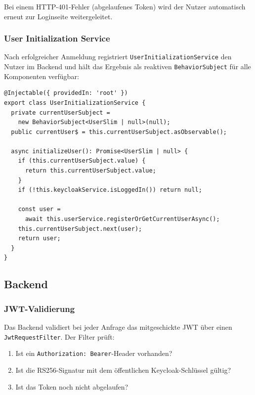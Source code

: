 Bei einem HTTP-401-Fehler (abgelaufenes Token) wird der Nutzer
automatisch erneut zur Loginseite weitergeleitet.

\subsubsection{User Initialization Service}

Nach erfolgreicher Anmeldung registriert \texttt{UserInitializationService}
den Nutzer im Backend und hält das Ergebnis als reaktiven
\texttt{BehaviorSubject} für alle Komponenten verfügbar:

\begin{lstlisting}[style=tsstyle,
                   caption={UserInitializationService (user-initialization.service.ts)},
                   label={lst:user-init-service}]
@Injectable({ providedIn: 'root' })
export class UserInitializationService {
  private currentUserSubject =
    new BehaviorSubject<UserSlim | null>(null);
  public currentUser$ = this.currentUserSubject.asObservable();

  async initializeUser(): Promise<UserSlim | null> {
    if (this.currentUserSubject.value) {
      return this.currentUserSubject.value;
    }
    if (!this.keycloakService.isLoggedIn()) return null;

    const user =
      await this.userService.registerOrGetCurrentUserAsync();
    this.currentUserSubject.next(user);
    return user;
  }
}
\end{lstlisting}

\subsection{Backend}

\subsubsection{JWT-Validierung}

Das Backend validiert bei jeder Anfrage das mitgeschickte JWT über
einen \texttt{JwtRequestFilter}. Der Filter prüft:

\begin{enumerate}
    \item Ist ein \texttt{Authorization: Bearer}-Header vorhanden?
    \item Ist die RS256-Signatur mit dem öffentlichen Keycloak-Schlüssel
    gültig?
    \item Ist das Token noch nicht abgelaufen?
\end{enumerate}

